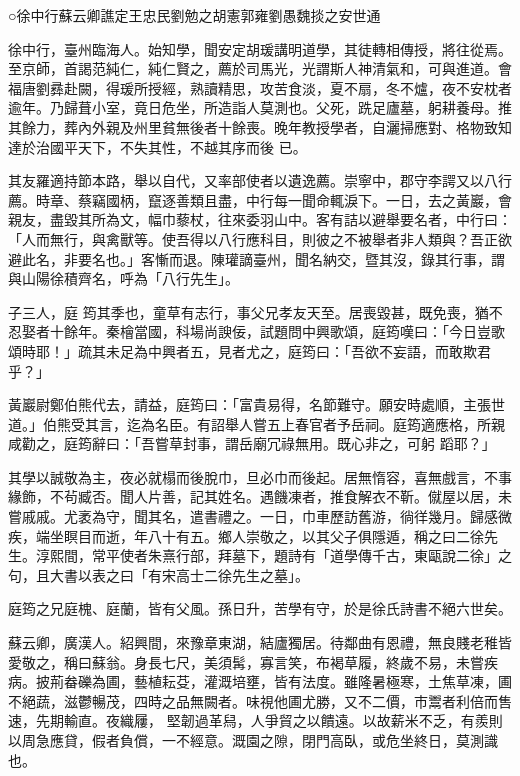 
\begin{pinyinscope}

 ○徐中行蘇云卿譙定王忠民劉勉之胡憲郭雍劉愚魏掞之安世通



 徐中行，臺州臨海人。始知學，聞安定胡瑗講明道學，其徒轉相傳授，將往從焉。至京師，首謁范純仁，純仁賢之，薦於司馬光，光謂斯人神清氣和，可與進道。會福唐劉彞赴闕，得瑗所授經，熟讀精思，攻苦食淡，夏不扇，冬不爐，夜不安枕者逾年。乃歸葺小室，竟日危坐，所造詣人莫測也。父死，跣足廬墓，躬耕養母。推其餘力，葬內外親及州里貧無後者十餘喪。晚年教授學者，自灑掃應對、格物致知達於治國平天下，不失其性，不越其序而後
 已。



 其友羅適持節本路，舉以自代，又率部使者以遺逸薦。崇寧中，郡守李諤又以八行薦。時章、蔡竊國柄，竄逐善類且盡，中行每一聞命輒淚下。一日，去之黃巖，會親友，盡毀其所為文，幅巾藜杖，往來委羽山中。客有詰以避舉要名者，中行曰：「人而無行，與禽獸等。使吾得以八行應科目，則彼之不被舉者非人類與？吾正欲避此名，非要名也。」客慚而退。陳瓘謫臺州，聞名納交，暨其沒，錄其行事，謂與山陽徐積齊名，呼為「八行先生」。



 子三人，庭
 筠其季也，童草有志行，事父兄孝友天至。居喪毀甚，既免喪，猶不忍娶者十餘年。秦檜當國，科場尚諛佞，試題問中興歌頌，庭筠嘆曰：「今日豈歌頌時耶！」疏其未足為中興者五，見者尤之，庭筠曰：「吾欲不妄語，而敢欺君乎？」



 黃巖尉鄭伯熊代去，請益，庭筠曰：「富貴易得，名節難守。願安時處順，主張世道。」伯熊受其言，迄為名臣。有詔舉人嘗五上春官者予岳祠。庭筠適應格，所親咸勸之，庭筠辭曰：「吾嘗草封事，謂岳廟冗祿無用。既心非之，可躬
 蹈耶？」



 其學以誠敬為主，夜必就榻而後脫巾，旦必巾而後起。居無惰容，喜無戲言，不事緣飾，不茍臧否。聞人片善，記其姓名。遇饑凍者，推食解衣不靳。僦屋以居，未嘗戚戚。尤袤為守，聞其名，遣書禮之。一日，巾車歷訪舊游，徜徉幾月。歸感微疾，端坐瞑目而逝，年八十有五。鄉人崇敬之，以其父子俱隱遁，稱之曰二徐先生。淳熙間，常平使者朱熹行部，拜墓下，題詩有「道學傳千古，東甌說二徐」之句，且大書以表之曰「有宋高士二徐先生之墓」。



 庭筠之兄庭槐、庭蘭，皆有父風。孫日升，苦學有守，於是徐氏詩書不絕六世矣。



 蘇云卿，廣漢人。紹興間，來豫章東湖，結廬獨居。待鄰曲有恩禮，無良賤老稚皆愛敬之，稱曰蘇翁。身長七尺，美須髯，寡言笑，布褐草履，終歲不易，未嘗疾病。披荊畚礫為圃，藝植耘芟，灌溉培壅，皆有法度。雖隆暑極寒，土焦草凍，圃不絕蔬，滋鬱暢茂，四時之品無闕者。味視他圃尤勝，又不二價，市鬻者利倍而售速，先期輸直。夜織屨，
 堅韌過革舄，人爭貿之以饋遠。以故薪米不乏，有羨則以周急應貸，假者負償，一不經意。溉園之隙，閉門高臥，或危坐終日，莫測識也。




\end{pinyinscope}
